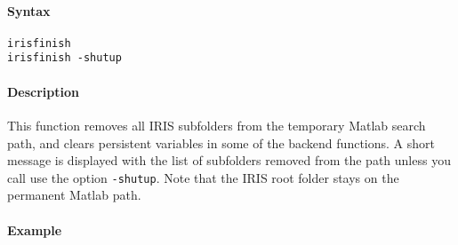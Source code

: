 


	\paragraph{Syntax}

\begin{verbatim}
irisfinish
irisfinish -shutup
\end{verbatim}

\paragraph{Description}

This function removes all IRIS subfolders from the temporary Matlab
search path, and clears persistent variables in some of the backend
functions. A short message is displayed with the list of subfolders
removed from the path unless you call use the option \texttt{-shutup}.
Note that the IRIS root folder stays on the permanent Matlab path.

\paragraph{Example}


